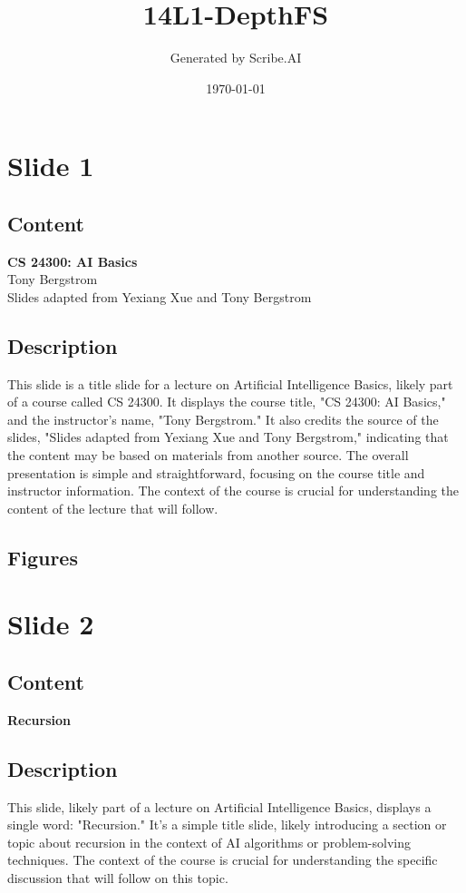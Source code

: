 \documentclass{article}%
\title{14L1{-}DepthFS}%
\author{Generated by Scribe.AI}%
\date{\today}%
\begin{document}
%
\normalsize%
\maketitle%
\section{Slide 1}%
\label{sec:Slide1}%
\subsection{Content}%

\textbf{CS 24300: AI Basics} \\
Tony Bergstrom \\
Slides adapted from Yexiang Xue and Tony Bergstrom
%
\subsection{Description}%
This slide is a title slide for a lecture on Artificial Intelligence Basics, likely part of a course called CS 24300.  It displays the course title, "CS 24300: AI Basics," and the instructor's name, "Tony Bergstrom."  It also credits the source of the slides, "Slides adapted from Yexiang Xue and Tony Bergstrom," indicating that the content may be based on materials from another source.  The overall presentation is simple and straightforward, focusing on the course title and instructor information.  The context of the course is crucial for understanding the content of the lecture that will follow.%
\subsection{Figures}%
\begin{figure}[H]%
\centering%
\end{figure}

%
\newpage%
\section{Slide 2}%
\label{sec:Slide2}%
\subsection{Content}%

\textbf{Recursion}
%
\subsection{Description}%
This slide, likely part of a lecture on Artificial Intelligence Basics, displays a single word: "Recursion."  It's a simple title slide, likely introducing a section or topic about recursion in the context of AI algorithms or problem-solving techniques.  The context of the course is crucial for understanding the specific discussion that will follow on this topic.%
\end{document}
